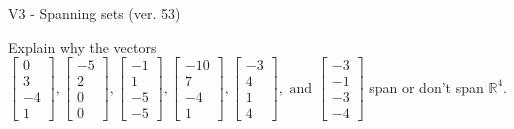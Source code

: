 \begin{exercise}
  \begin{exerciseTitle}V3 - Spanning sets (ver. 53)\end{exerciseTitle}
  \begin{exerciseStatement}
    Explain why the vectors \(\left[\begin{array}{r}
0 \\
3 \\
-4 \\
1
\end{array}\right] , \left[\begin{array}{r}
-5 \\
2 \\
0 \\
0
\end{array}\right] , \left[\begin{array}{r}
-1 \\
1 \\
-5 \\
-5
\end{array}\right] , \left[\begin{array}{r}
-10 \\
7 \\
-4 \\
1
\end{array}\right] , \left[\begin{array}{r}
-3 \\
4 \\
1 \\
4
\end{array}\right] , \text{ and } \left[\begin{array}{r}
-3 \\
-1 \\
-3 \\
-4
\end{array}\right]\) span or don't span \(\mathbb{R}^4\). 
	



\end{exerciseStatement}
\end{exercise}
